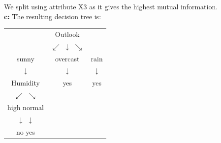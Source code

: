 We split using attribute X3 as it gives the highest mutual information.\\

\textbf{c:} The resulting decision tree is:

\begin{center}
\begin{tabular}{ccc}
& Outlook & \\
& $\swarrow$ \quad $\downarrow$ \quad $\searrow$ & \\
sunny & overcast & rain \\
$\downarrow$ & $\downarrow$ & $\downarrow$ \\
Humidity & yes & yes \\
$\swarrow$ \quad $\searrow$ & & \\
high \quad normal & & \\
$\downarrow$ \quad $\downarrow$ & & \\
no \quad yes & & \\
\end{tabular}
\end{center}
\newpage